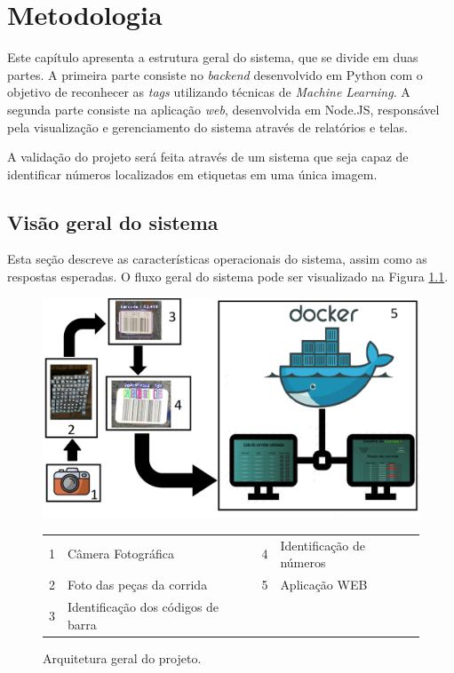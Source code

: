  \chapter{Metodologia}
 
Este capítulo apresenta a estrutura geral do sistema, que se divide em duas partes. A primeira parte consiste no \textit{backend} desenvolvido em Python com o objetivo de reconhecer as \textit{tags} utilizando técnicas de \textit{Machine Learning}. A segunda parte consiste na aplicação \textit{web}, desenvolvida em Node.JS, responsável pela visualização e gerenciamento do sistema através de relatórios e telas.

A validação do projeto será feita através de um sistema que seja capaz de identificar números localizados em etiquetas em uma única imagem.


\section{Visão geral do sistema} \label{sec:funcionamento}

Esta seção descreve as características operacionais do sistema, assim como as respostas esperadas. O fluxo geral do sistema pode ser visualizado na Figura \ref{fig:arqgeral}.

\begin{figure}[htbp]
	\centering
	\includegraphics[width=1\linewidth]{capitulos/FluxoDoProjeto.png}
	\caption{Arquitetura geral do projeto.}
	\begin{tabular}{r@{: }l r@{: }l}
    1 & Câmera Fotográfica & 4 & Identificação de números \\
    2& Foto das peças da corrida & 5 & Aplicação WEB \\
    3 & Identificação dos códigos de  barra
    \end{tabular}
	\label{fig:arqgeral}
\end{figure}


